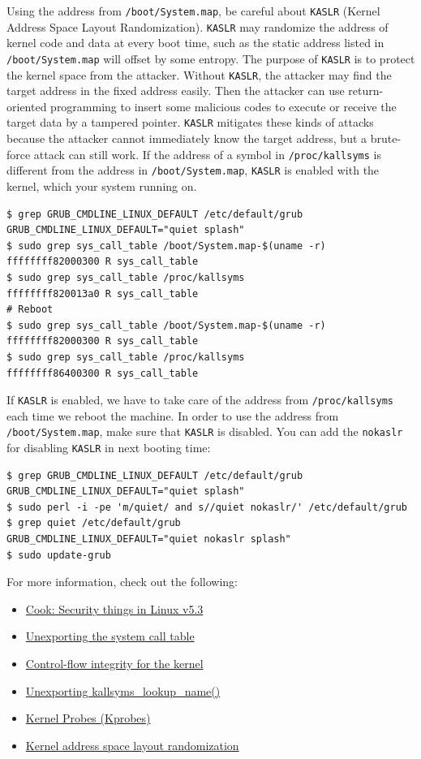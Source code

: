 \documentclass[10pt, oneside]{book}
\begin{document}
Using the address from \verb|/boot/System.map|, be careful about \verb|KASLR| (Kernel Address Space Layout Randomization).
\verb|KASLR| may randomize the address of kernel code and data at every boot time, such as the static address listed in \verb|/boot/System.map| will offset by some entropy.
The purpose of \verb|KASLR| is to protect the kernel space from the attacker.
Without \verb|KASLR|, the attacker may find the target address in the fixed address easily.
Then the attacker can use return-oriented programming to insert some malicious codes to execute or receive the target data by a tampered pointer.
\verb|KASLR| mitigates these kinds of attacks because the attacker cannot immediately know the target address, but a brute-force attack can still work.
If the address of a symbol in \verb|/proc/kallsyms| is different from the address in \verb|/boot/System.map|, \verb|KASLR| is enabled with the kernel, which your system running on.
\begin{verbatim}
$ grep GRUB_CMDLINE_LINUX_DEFAULT /etc/default/grub
GRUB_CMDLINE_LINUX_DEFAULT="quiet splash"
$ sudo grep sys_call_table /boot/System.map-$(uname -r)
ffffffff82000300 R sys_call_table
$ sudo grep sys_call_table /proc/kallsyms
ffffffff820013a0 R sys_call_table
# Reboot
$ sudo grep sys_call_table /boot/System.map-$(uname -r)
ffffffff82000300 R sys_call_table
$ sudo grep sys_call_table /proc/kallsyms
ffffffff86400300 R sys_call_table
\end{verbatim}
If \verb|KASLR| is enabled, we have to take care of the address from \verb|/proc/kallsyms| each time we reboot the machine.
In order to use the address from \verb|/boot/System.map|, make sure that \verb|KASLR| is disabled.
You can add the \verb|nokaslr| for disabling \verb|KASLR| in next booting time:
\begin{verbatim}
$ grep GRUB_CMDLINE_LINUX_DEFAULT /etc/default/grub
GRUB_CMDLINE_LINUX_DEFAULT="quiet splash"
$ sudo perl -i -pe 'm/quiet/ and s//quiet nokaslr/' /etc/default/grub
$ grep quiet /etc/default/grub
GRUB_CMDLINE_LINUX_DEFAULT="quiet nokaslr splash"
$ sudo update-grub
\end{verbatim}

For more information, check out the following:

\begin{itemize}
  \item \href{https://lwn.net/Articles/804849/}{Cook: Security things in Linux v5.3}
  \item \href{https://lwn.net/Articles/12211/}{Unexporting the system call table}
  \item \href{https://lwn.net/Articles/810077/}{Control-flow integrity for the kernel}
  \item \href{https://lwn.net/Articles/813350/}{Unexporting kallsyms\_lookup\_name()}
  \item \href{https://www.kernel.org/doc/Documentation/kprobes.txt}{Kernel Probes (Kprobes)}
  \item \href{https://lwn.net/Articles/569635/}{Kernel address space layout randomization}
\end{itemize}
\end{document}
